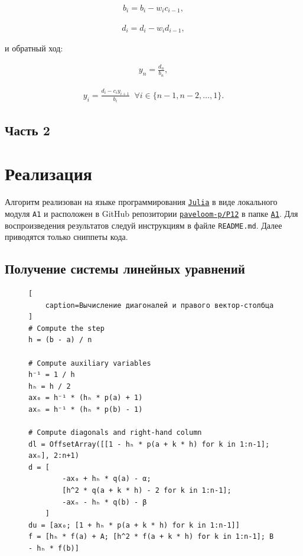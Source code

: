 \begin{gather}
    b_i = b_i - w_i c_{i-1},
\end{gather}

\begin{gather}
    d_i = d_i - w_i d_{i-1},
\end{gather}

и обратный ход:

\hs
\begin{gather}
    y_n = \frac{d_n}{b_n},
\end{gather}

\begin{gather}
    y_i = \frac{d_i - c_i y_{i+1}}{b_i} \;\; \forall i \in \{n-1, n-2, \dots, 1\}.
\end{gather}

\newpage

\subsection*{Часть 2}
\section*{Реализация}

\vspace{18pt}

Алгоритм реализован на языке программирования \href{https://julialang.org}{\footnotesize \texttt{Julia}} в виде локального модуля {\footnotesize \texttt{A1}} и расположен в GitHub репозитории \href{https://github.com/paveloom-p/P12}{\footnotesize \texttt{paveloom-p/P12}} в папке \href{https://github.com/paveloom-p/P12/tree/master/A1}{\footnotesize \texttt{A1}}. Для воспроизведения результатов следуй инструкциям в файле {\footnotesize \texttt{README.md}}. Далее приводятся только сниппеты кода.

\subsection{Получение системы линейных уравнений}

\begin{figure}[H]
\begin{lstlisting}[
    caption=Вычисление диагоналей и правого вектор-столбца
]
# Compute the step
h = (b - a) / n

# Compute auxiliary variables
h⁻¹ = 1 / h
hₕ = h / 2
ax₀ = h⁻¹ * (hₕ * p(a) + 1)
axₙ = h⁻¹ * (hₕ * p(b) - 1)

# Compute diagonals and right-hand column
dl = OffsetArray([[1 - hₕ * p(a + k * h) for k in 1:n-1]; axₙ], 2:n+1)
d = [
        -ax₀ + hₕ * q(a) - α;
        [h^2 * q(a + k * h) - 2 for k in 1:n-1];
        -axₙ - hₕ * q(b) - β
    ]
du = [ax₀; [1 + hₕ * p(a + k * h) for k in 1:n-1]]
f = [hₕ * f(a) + A; [h^2 * f(a + k * h) for k in 1:n-1]; B - hₕ * f(b)]
\end{lstlisting}
\end{figure}

